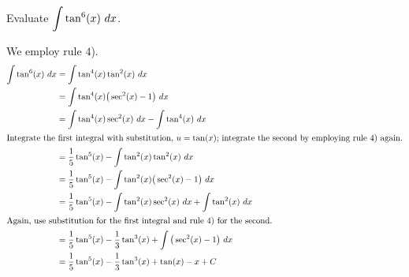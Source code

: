 \begin{example} \label{eg:5.2.5} %
Evaluate $\displaystyle\int\tan^6(x)\ dx$.

\solution
We employ rule $4$). 
\begin{align*}
\int \tan^6(x)\ dx &= \int \tan^4(x)\tan^2(x)\ dx \\
			&= \int\tan^4(x)\big(\sec^2(x)-1\big)\ dx\\
			&= \int\tan^4(x)\sec^2(x)\ dx - \int\tan^4(x)\ dx \\
\intertext{Integrate the first integral with substitution, $u=\tan(x)$; integrate the second by employing rule $4$) again.}
			&=	\frac15\tan^5(x)-\int\tan^2(x)\tan^2(x)\ dx\\
			&=	\frac15\tan^5(x)-\int\tan^2(x)\big(\sec^2(x)-1\big)\ dx \\
			&= \frac15\tan^5(x) -\int\tan^2(x)\sec^2(x)\ dx + \int\tan^2(x)\ dx\\
\intertext{Again, use substitution for the first integral and rule $4$) for the second.}
			&= \frac15\tan^5(x)-\frac13\tan^3(x)+\int\big(\sec^2(x)-1\big)\ dx \\
			&= \frac15\tan^5(x)-\frac13\tan^3(x)+\tan(x) - x+C
\end{align*}

\end{example}